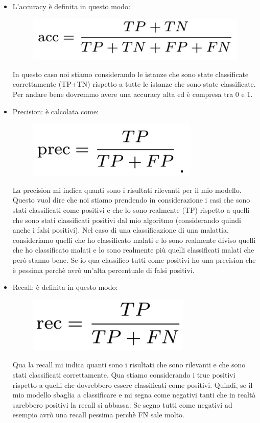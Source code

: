 \documentclass[14pt]{extreport}
\begin{document}
\begin{itemize}
	\item L’accuracy è definita in questo modo: 
	\begin{figure}[H] 
	\centering
	\includegraphics[width=0.7\linewidth]{457.jpeg}
	\end{figure}
	In questo caso noi stiamo considerando le istanze che sono state classificate correttamente (TP+TN) rispetto a tutte le istanze che sono state classificate.
	Per andare bene dovremmo avere una accuracy alta ed è compresa tra 0 e 1.
	\item Precision: è calcolata come:
	\begin{figure}[H] 
	\centering
	\includegraphics[width=0.7\linewidth]{458.jpeg}
	\end{figure} 
	La precision mi indica quanti sono i risultati rilevanti per il mio modello.
	Questo vuol dire che noi stiamo prendendo in considerazione i casi che sono stati classificati come positivi e che lo sono realmente (TP) rispetto a quelli che sono stati classificati positivi dal mio algoritmo (considerando quindi anche i falsi positivi). Nel caso di una classificazione di una malattia, consideriamo quelli che ho classificato malati e lo sono realmente diviso quelli che ho classificato malati e lo sono realmente più quelli classificati malati che però stanno bene.
	Se io qua classifico tutti come positivi ho una precision che è pessima perchè avrò un’alta percentuale di falsi positivi.
	\item Recall: è definita in questo modo:
	\begin{figure}[H] 
	\centering
	\includegraphics[width=0.7\linewidth]{459.jpeg}
	\end{figure}
	Qua la recall mi indica quanti sono i risultati che sono rilevanti e che sono stati classificati correttamente.
	Qua stiamo considerando i true positivi rispetto a quelli che dovrebbero essere classificati come positivi. Quindi, se il mio modello sbaglia a classificare e mi segna come negativi tanti che in realtà sarebbero positivi la recall si abbassa. Se segno tutti come negativi ad esempio avrò una recall pessima perchè FN sale molto.
\end{itemize}
\end{document}
